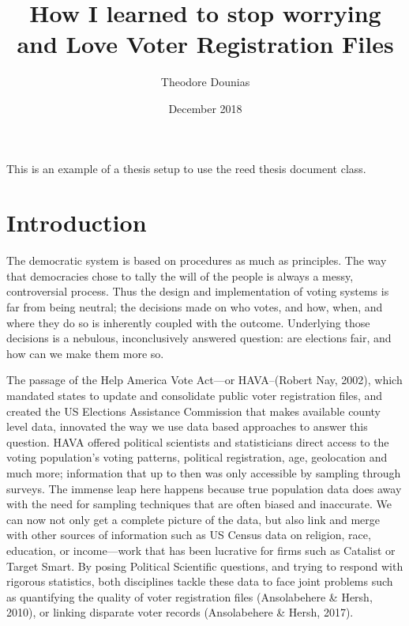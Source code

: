 \documentclass[12pt,twoside]{reedthesis}
\title{How I learned to stop worrying and Love Voter Registration Files}
\author{Theodore Dounias}
\date{December 2018}
\begin{document}
      \maketitle
  
  \frontmatter %
  \pagestyle{empty} %

  
      \begin{preface}
      This is an example of a thesis setup to use the reed thesis document
      class.
    \end{preface}
  
      \hypersetup{linkcolor=black}
    \setcounter{tocdepth}{3}
    \tableofcontents
  
      \listoftables
  
      \listoffigures
  
  
  
  \mainmatter %
  \pagestyle{fancyplain} %

  \chapter*{Introduction}\label{introduction}
  
  The democratic system is based on procedures as much as principles. The
  way that democracies chose to tally the will of the people is always a
  messy, controversial process. Thus the design and implementation of
  voting systems is far from being neutral; the decisions made on who
  votes, and how, when, and where they do so is inherently coupled with
  the outcome. Underlying those decisions is a nebulous, inconclusively
  answered question: are elections fair, and how can we make them more so.
  
  The passage of the Help America Vote Act---or HAVA--(Robert Nay, 2002),
  which mandated states to update and consolidate public voter
  registration files, and created the US Elections Assistance Commission
  that makes available county level data, innovated the way we use data
  based approaches to answer this question. HAVA offered political
  scientists and statisticians direct access to the voting population's
  voting patterns, political registration, age, geolocation and much more;
  information that up to then was only accessible by sampling through
  surveys. The immense leap here happens because true population data does
  away with the need for sampling techniques that are often biased and
  inaccurate. We can now not only get a complete picture of the data, but
  also link and merge with other sources of information such as US Census
  data on religion, race, education, or income---work that has been
  lucrative for firms such as Catalist or Target Smart. By posing
  Political Scientific questions, and trying to respond with rigorous
  statistics, both disciplines tackle these data to face joint problems
  such as quantifying the quality of voter registration files
  (Ansolabehere \& Hersh, 2010), or linking disparate voter records
  (Ansolabehere \& Hersh, 2017).
  
\end{document}
